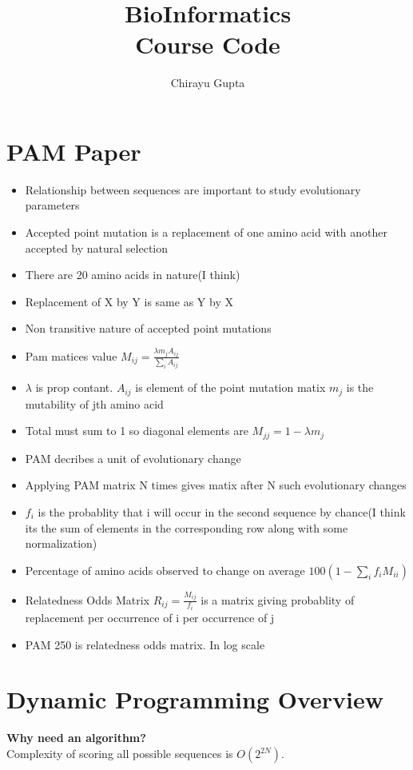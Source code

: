 \documentclass{scrartcl}
\title{ BioInformatics \\ \large{ Course Code } }
\author{Chirayu Gupta}
\date{}
\begin{document}
\maketitle
\section{PAM Paper}
\begin{itemize}
	\item Relationship between sequences are important to study evolutionary parameters
	\item Accepted point mutation is a replacement of one amino acid with another accepted by natural selection
	\item There are 20 amino acids in nature(I think)
	\item Replacement of X by Y is same as Y by X
	\item Non transitive nature of accepted point mutations
	\item  Pam matices value \(  M_{ij} = \displaystyle\frac{\lambda m_j A_{ij}}{\displaystyle\sum_{i}^{}A_{ij}} \)
	\item \( \lambda \) is prop contant. \( A_{ij} \) is element of the point mutation matix \( m_j \) is the mutability of jth amino acid
	\item Total must sum to 1 so diagonal elements are \( M_{jj} = 1 - \lambda m_j \)
	\item PAM decribes a unit of evolutionary change
	\item Applying PAM matrix N times gives matix after N such evolutionary changes
	\item \( f_i \) is the probablity that i will occur in the second sequence by chance(I think its the sum of elements in the corresponding row along with some normalization)
	\item Percentage of amino acids observed to change on average \( 100(1 - \displaystyle\sum_{i}^{}f_i M_{ii}) \)
	\item Relatedness Odds Matrix \( R_{ij} = \displaystyle\frac{M_{ij}}{f_i} \) is a matrix giving probablity of replacement per occurrence of i per occurrence of j
	\item PAM 250 is relatedness odds matrix. In log scale
\end{itemize}
\section{Dynamic Programming Overview}
\textbf{Why need an algorithm?}\\
Complexity of scoring all possible sequences is \( O(2^{2N}) \).\\
\end{document}
